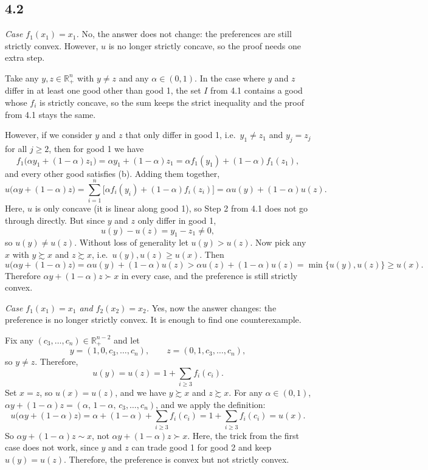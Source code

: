 \documentclass[12pt,letterpaper]{article}
\begin{document}
\subsection*{4.2}

\textit{Case $f_1(x_1)=x_1$.} No, the answer does not change: the preferences are still strictly convex. However, $u$ is no longer strictly concave, so the proof needs one extra step.

Take any $y,z\in\mathbb{R}^n_+$ with $y\neq z$ and any $\alpha\in(0,1)$. In the case where $y$ and $z$ differ in at least one good other than good 1, the set $I$ from 4.1 contains a good whose $f_i$ is strictly concave, so the sum keeps the strict inequality and the proof from 4.1 stays the same.

However, if we consider $y$ and $z$ that only differ in good 1, i.e.\ $y_1\neq z_1$ and $y_j=z_j$ for all $j\ge 2$, then for good 1 we have
\[
f_1\big(\alpha y_1+(1-\alpha)z_1\big) = \alpha y_1+(1-\alpha)z_1 = \alpha f_1(y_1)+(1-\alpha)f_1(z_1),
\]
and every other good satisfies (b). Adding them together,
\[
u\big(\alpha y+(1-\alpha)z\big) = \sum_{i=1}^n \Big[\alpha f_i(y_i)+(1-\alpha)f_i(z_i)\Big] = \alpha u(y)+(1-\alpha)u(z).
\]
Here, $u$ is only concave (it is linear along good 1), so Step 2 from 4.1 does not go through directly. But since $y$ and $z$ only differ in good 1,
\[
u(y)-u(z) = y_1-z_1 \neq 0,
\]
so $u(y)\neq u(z)$. Without loss of generality let $u(y)>u(z)$. Now pick any $x$ with $y\succsim x$ and $z\succsim x$, i.e.\ $u(y),u(z)\ge u(x)$. Then
\[
u\big(\alpha y+(1-\alpha)z\big) = \alpha u(y)+(1-\alpha)u(z) > \alpha u(z)+(1-\alpha)u(z) = \min\{u(y),u(z)\} \ge u(x).
\]
Therefore $\alpha y+(1-\alpha)z\succ x$ in every case, and the preference is still strictly convex.


\textit{Case $f_1(x_1)=x_1$ and $f_2(x_2)=x_2$.} Yes, now the answer changes: the preference is no longer strictly convex. It is enough to find one counterexample.

Fix any $(c_3,\dots,c_n)\in\mathbb{R}^{n-2}_+$ and let
\[
y=(1,0,c_3,\dots,c_n), \qquad z=(0,1,c_3,\dots,c_n),
\]
so $y\neq z$. Therefore,
\[
u(y)=u(z)=1+\sum_{i\ge 3} f_i(c_i).
\]
Set $x=z$, so $u(x)=u(z)$, and we have $y\succsim x$ and $z\succsim x$. For any $\alpha\in(0,1)$, $\alpha y+(1-\alpha)z=(\alpha,\,1-\alpha,\,c_3,\dots,c_n)$, and we apply the definition:
\[
u\big(\alpha y+(1-\alpha)z\big) = \alpha+(1-\alpha)+\sum_{i\ge 3} f_i(c_i) = 1+\sum_{i\ge 3} f_i(c_i) = u(x).
\]
So $\alpha y+(1-\alpha)z\sim x$, not $\alpha y+(1-\alpha)z\succ x$. Here, the trick from the first case does not work, since $y$ and $z$ can trade good 1 for good 2 and keep $u(y)=u(z)$. Therefore, the preference is convex but not strictly convex.
\end{document}
